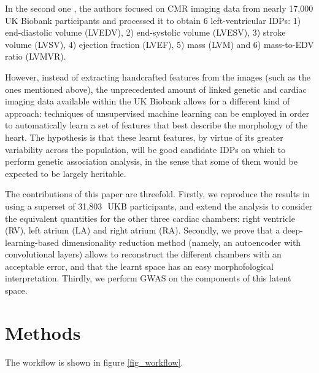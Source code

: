\documentclass[twocolumn]{llncs}
\newcommand{\NCMR}{31,803\,} %
\begin{document}
In the second one \cite{ref_nayaung}, the authors focused on CMR imaging data from nearly 17,000 UK Biobank participants and processed it to obtain 6 left-ventricular IDPs: 1) end-diastolic volume (LVEDV), 2) end-systolic volume (LVESV), 3) stroke volume (LVSV), 4) ejection fraction (LVEF), 5) mass (LVM) and 6) mass-to-EDV ratio (LVMVR).

However, instead of extracting handcrafted features from the images (such as the ones mentioned above), the unprecedented amount of linked genetic and cardiac imaging data available within the UK Biobank allows for a different kind of approach: techniques of unsupervised machine learning can be employed in order to automatically learn a set of features that best describe the morphology of the heart. 
The hypothesis is that these learnt features, by virtue of its greater variability across the population, will be good candidate IDPs on which to perform genetic association analysis, in the sense that some of them would be expected to be largely heritable.

The contributions of this paper are threefold. Firstly, we reproduce the results in \cite{ref_nayaung} using a superset of \NCMR\, UKB participants, and extend the analysis to consider the equivalent quantities for the other three cardiac chambers: right ventricle (RV), left atrium (LA) and right atrium (RA).
Secondly, we prove that a deep-learning-based dimensionality reduction method (namely, an autoencoder with convolutional layers) allows to reconstruct the different chambers with an acceptable error, and that the learnt space has an easy morphofological interpretation. Thirdly, we perform GWAS on the components of this latent space.

\section{Methods}
The workflow is shown in figure \ref{fig_workflow}.
\end{document}
